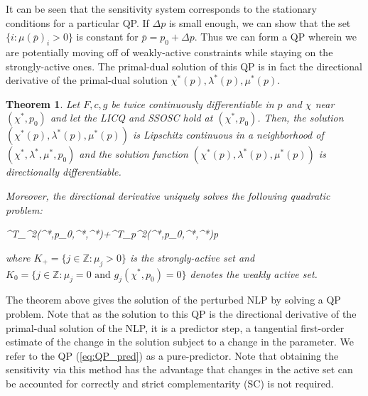\documentclass{article}
\newtheorem{theorem}{Theorem}[section]
\theoremstyle{example}
\theoremstyle{definition}
\theoremstyle{assumption}
\theoremstyle{lemma}
\begin{document}
	\par
	It can be seen that the sensitivity system corresponds to the stationary conditions for a particular QP.
	If $\Delta p$ is small enough, we can show that the set $\{i:\mu(\bar{p})_i>0\}$ is constant for $\bar{p}=p_0+\Delta p$.
	Thus we can form a QP wherein we are potentially moving off of weakly-active constraints while staying on the strongly-active ones.
	The primal-dual solution of this QP is in fact the directional derivative of the primal-dual solution $\chi^*(p),\lambda^*(p),\mu^*(p)$.
	\begin{theorem}
		Let $F,c,g$ be twice continuously differentiable in $p$ and $\chi$ near $(\chi^*,p_0)$ and let the LICQ and SSOSC hold at $(\chi^*,p_0)$.
		Then, the solution $(\chi^*(p),\lambda^*(p),\mu^*(p))$ is Lipschitz continuous in a neighborhood of $(\chi^*,\lambda^*,\mu^*,p_0)$ and the solution function $(\chi^*(p),\lambda^*(p),\mu^*(p))$ is directionally differentiable.
		\par
		Moreover, the directional derivative uniquely solves the following quadratic problem:
		\begin{mini!}
			{\Delta\chi}{\Delta\chi^T\nabla_{\chi\chi}^2\Lagrange(\chi^*,p_0,\lambda^*,\mu^*)\Delta\chi+\Delta\chi^T\nabla_{p\chi}^2\Lagrange(\chi^*,p_0,\lambda^*,\mu^*)\Delta p}{}{}
			\label{eq:QP_pred}
		\end{mini!}
	where $K_+=\{j\in\mathbb{Z}:\mu_j>0\}$ is the strongly-active set and $K_0=\{j\in\mathbb{Z}:\mu_j=0 \text{ and } g_j(\chi^*,p_0)=0\}$ denotes the weakly active set.
	\end{theorem}
	\par
	The theorem above gives the solution of the perturbed NLP by solving a QP problem.
	Note that as the solution to this QP is the directional derivative of the primal-dual solution of the NLP, it is a predictor step, a tangential first-order estimate of the change in the solution subject to a change in the parameter.
	We refer to the QP (\ref{eq:QP_pred}) as a pure-predictor.
	Note that obtaining the sensitivity via this method has the advantage that changes in the active set can be accounted for correctly and strict complementarity (SC) is not required.
\end{document}
